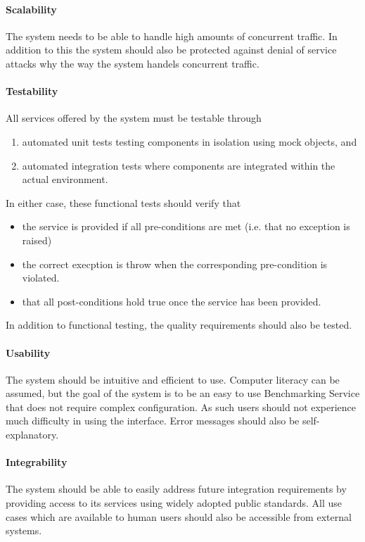 \paragraph{Scalability}
The system needs to be able to handle high amounts of concurrent traffic.
In addition to this the system should also be protected against
denial of service attacks why the way the system handels concurrent traffic.

\paragraph{Testability}
All services offered by the system must be testable through
\begin{enumerate}
	\item automated unit tests testing components in isolation using mock objects, and
	\item automated integration tests where components are integrated within the actual environment.
\end{enumerate}

In either case, these functional tests should verify that
\begin{itemize}
	\item the service is provided if all pre-conditions are met (i.e. that no exception is raised)
	\item the correct execption is throw when the corresponding pre-condition
	is violated.
	\item that all post-conditions hold true once the service has been provided.
\end{itemize}

In addition to functional testing, the quality requirements should also be tested.

\paragraph{Usability}
The system should be intuitive and efficient to use. Computer literacy can be
assumed, but the goal of the system is to be an easy to use Benchmarking
Service that does not require complex configuration. As such users should
not experience much difficulty in using the interface. Error messages should
also be self-explanatory.

\paragraph{Integrability}
The system should be able to easily address future integration requirements
by providing access to its services using widely adopted public standards.
All use cases which are available to human users should also be accessible from external systems.

